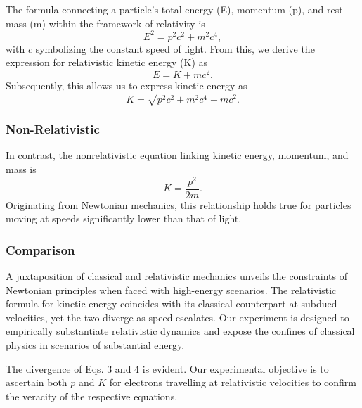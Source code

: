 \documentclass[12pt]{article}
\begin{document}
                The formula connecting a particle's total energy (E), momentum (p), and rest mass (m) within the framework of relativity is
                \begin{equation}
                E^2 = p^2c^2 + m^2c^4,
                \end{equation}
                with \( c \) symbolizing the constant speed of light. From this, we derive the expression for relativistic kinetic energy (K) as
                \begin{equation}
                E = K + mc^2.
                \end{equation}
                Subsequently, this allows us to express kinetic energy as
                \begin{equation}
                K = \sqrt{p^2c^2 + m^2c^4} - mc^2.
                \end{equation}

            
            \subsubsection{Non-Relativistic}                
                    In contrast, the nonrelativistic equation linking kinetic energy, momentum, and mass is
                    \begin{equation}
                    K = \frac{p^2}{2m}.
                    \end{equation}
                    Originating from Newtonian mechanics, this relationship holds true for particles moving at speeds significantly lower than that of light.
            
            \subsubsection{Comparison}
                    A juxtaposition of classical and relativistic mechanics unveils the constraints of Newtonian principles when faced with high-energy scenarios. The relativistic formula for kinetic energy coincides with its classical counterpart at subdued velocities, yet the two diverge as speed escalates. Our experiment is designed to empirically substantiate relativistic dynamics and expose the confines of classical physics in scenarios of substantial energy.

                    The divergence of Eqs. 3 and 4 is evident. Our experimental objective is to ascertain both \( p \) and \( K \) for electrons travelling at relativistic velocities to confirm the veracity of the respective equations.
\end{document}
